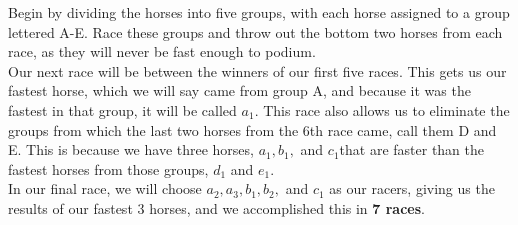 \documentclass[12pt]{article}
\begin{document}
\begin{enumerate}
Begin by dividing the horses into five groups, with each horse assigned to a group lettered A-E.
Race these groups and throw out the bottom two horses from each race, as they will
never be fast enough to podium. \\
Our next race will be between the winners of our first five races. This gets us our
fastest horse, which we will say came from group A, and because it was the fastest
in that group, it will be called $a_1$. This race also allows us to eliminate the
groups from which the last two horses from the 6th race came, call them D and E.
This is because we have three horses, $a_1, b_1,$ and $ c_1$that are faster than
the fastest horses from those groups, $d_1$ and $e_1$. \\
In our final race, we will choose $a_2, a_3, b_1, b_2,$ and $c_1$ as our racers,
giving us the results of our fastest 3 horses, and we accomplished this in {\bf 7 races}.


\end{enumerate}
\end{document}
